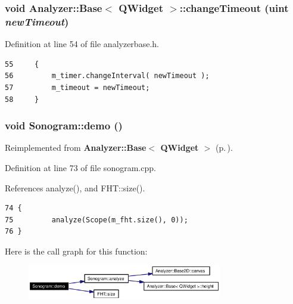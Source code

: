 \subsubsection{\setlength{\rightskip}{0pt plus 5cm}void {\bf Analyzer::Base}$<$ {\bf QWidget}  $>$::change\-Timeout (uint {\em new\-Timeout})\hspace{0.3cm}{\tt  [inline, protected, inherited]}}\label{classAnalyzer_1_1Base_Analyzer_1_1Baseb6}




Definition at line 54 of file analyzerbase.h.



\footnotesize\begin{verbatim}55     {
56         m_timer.changeInterval( newTimeout );
57         m_timeout = newTimeout;
58     }
\end{verbatim}\normalsize 
{}
\subsubsection{\setlength{\rightskip}{0pt plus 5cm}void Sonogram::demo ()\hspace{0.3cm}{\tt  [virtual]}}\label{classSonogram_Sonograma5}




Reimplemented from {\bf Analyzer::Base$<$ QWidget $>$} {\rm (p.\,\pageref{classAnalyzer_1_1Base_Analyzer_1_1Baseb5})}.

Definition at line 73 of file sonogram.cpp.

References analyze(), and FHT::size().



\footnotesize\begin{verbatim}74 {
75         analyze(Scope(m_fht.size(), 0));
76 }
\end{verbatim}\normalsize 


Here is the call graph for this function:\begin{figure}[H]
\begin{center}
\leavevmode
\includegraphics[width=241pt]{classSonogram_Sonograma5_cgraph}
\end{center}
\end{figure}
